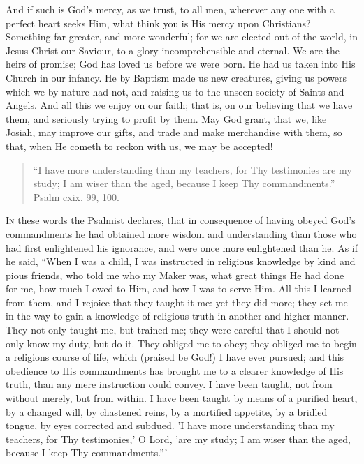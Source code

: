 And if such is God's mercy, as we trust, to all men, wherever any
one with a perfect heart seeks Him, what think you is His mercy upon
Christians? Something far greater, and more wonderful; for we are
elected out of the world, in Jesus Christ our Saviour, to a glory
incomprehensible and eternal. We are the heirs of promise; God has
loved us before we were born. He had us taken into His Church in our
infancy. He by Baptism made us new creatures, giving us powers which
we by nature had not, and raising us to the unseen society of Saints
and Angels. And all this we enjoy on our faith; that is, on our
believing that we have them, and seriously trying to profit by them.
May God grant, that we, like Josiah, may improve our gifts, and trade
and make merchandise with them, so that, when He cometh to reckon with
us, we may be accepted!


\begin{quote}

``I have more understanding than my teachers, for Thy
testimonies are my study; I am wiser than the aged, because I keep
Thy commandments.'' Psalm cxix. 99, 100.

\end{quote}

I\textsc{n} these words the Psalmist declares, that in consequence of having
obeyed God's commandments he had obtained more wisdom and
understanding than those who had first enlightened his ignorance, and
were once more enlightened than he. As if he said, ``When I was a
child, I was instructed in religious knowledge by kind and pious
friends, who told me who my Maker was, what great things He had done
for me, how much I owed to Him, and how I was to serve Him. All this I
learned from them, and I rejoice that they taught it me: yet they did
more; they set me in the way to gain a knowledge of religious truth in
another and higher manner. They not only taught me, but trained me;
they were careful that I should not only know my duty, but do it. They
obliged me to obey; they obliged me to begin a religions course of
life, which (praised be God!) I have ever pursued; and this obedience
to His commandments has brought me to a clearer knowledge of His
truth, than any mere instruction could convey. I have been taught, not
from without merely, but from within. I have been taught by means of a
purified heart, by a changed will, by chastened reins, by a mortified
appetite, by a bridled tongue, by eyes corrected and subdued. 'I have
more understanding than my teachers, for Thy testimonies,' O Lord,
'are my study; I am wiser than the aged, because I keep Thy
commandments.'''


